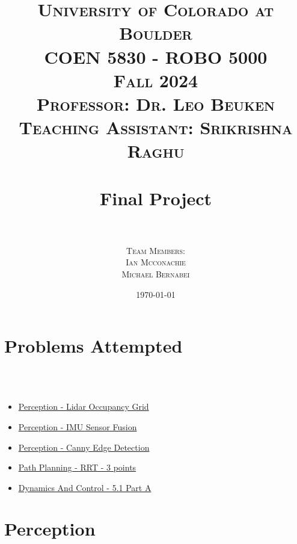 \documentclass{article}
\title{
\normalfont \LARGE
\textsc{University of Colorado at Boulder} \\ [25pt] %
\textsc{COEN 5830 - ROBO 5000} \\ [20pt]
\textsc{Fall 2024} \\ [20pt]
\textsc{Professor: Dr. Leo Beuken} \\ [12pt]
\textsc{Teaching Assistant: Srikrishna Raghu} \\ [12pt]
\horrule{1pt} \\[0.4cm] %
\huge Final Project \\ %
\horrule{1pt} \\[0.6cm] %
}
\author{
  \textsc{ Team Members:} \\ [4 mm]
  \textsc{ Ian Mcconachie}\\[2mm]
  \textsc{ Michael Bernabei}\\[2mm]
}
\date{\normalsize\today} %
\numberwithin{equation}{section} %
\numberwithin{figure}{section} %
\numberwithin{table}{section} %
\begin{document}
\maketitle %
\thispagestyle{empty} %
\newpage




\tableofcontents
\listofalgorithms

\newpage

%

\section{Problems Attempted}
\\~\\
\begin{center}
 \begin{minipage}{.4\textwidth}
 \begin{itemize}
    \item \hyperref[sec:Perception]{Perception - Lidar Occupancy Grid}
    \item \hyperref[sec:SensorFusion]{Perception - IMU Sensor Fusion}
    \item \hyperref[sec:CannyEdge]{Perception - Canny Edge Detection }
    \item \hyperref[sec:RRT]{Path Planning - RRT - 3 points }
    \item \hyperref[sec:DynAndCtrl]{Dynamics And Control - 5.1 Part A }
 \end{itemize}
 \end{minipage}
\end{center}


\newpage


\section{Perception}
\end{document}
